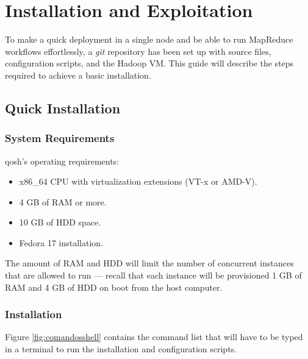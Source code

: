 \chapter{Installation and Exploitation}\label{cap:guiainstalacion}
\noindent To make a quick deployment in a single node and be able to run MapReduce workflows effortlessly, a \emph{git} repository has been set up with source files, configuration scripts, and the Hadoop VM. This guide will describe the steps required to achieve a basic installation.

\section{Quick Installation}\label{sec:instalacionqosh}

\subsection{System Requirements}\label{subsec:reqsis}
\noindent qosh's operating requirements:

\begin{itemize}
    \item x86\_64 CPU with virtualization extensions (VT-x or AMD-V).
    \item 4 GB of RAM or more.
    \item 10 GB of HDD space.
    \item Fedora 17 installation.
\end{itemize}

The amount of RAM and HDD will limit the number of concurrent instances that are allowed to run --- recall that each instance will be provisioned 1 GB of RAM and 4 GB of HDD on boot from the host computer.

\subsection{Installation}\label{subsec:instalacion}
\noindent Figure \ref{fig:comandosshell} contains the command list that will have to be typed in a terminal to run the installation and configuration scripts.

